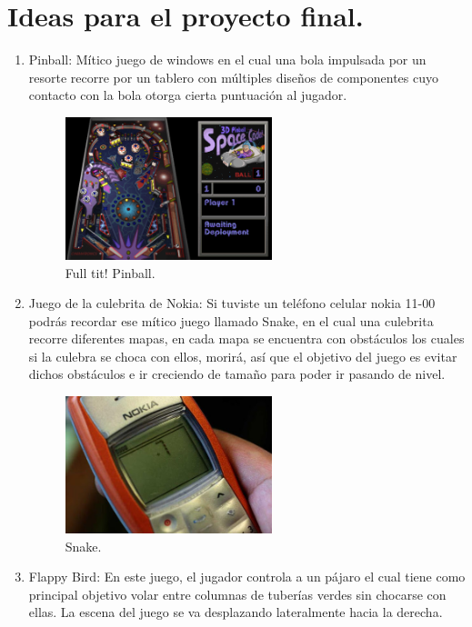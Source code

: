 \documentclass{article}
\begin{document}
\section{Ideas para el proyecto final.} \label{contenido}
\begin{enumerate}
  \item {Pinball:} Mítico juego de windows en el cual una bola impulsada por un resorte recorre por un tablero con múltiples diseños de componentes cuyo contacto con la bola otorga cierta puntuación al jugador.
  \begin{figure}[h]
  \includegraphics[width=6cm]{pinball.png}
  \centering
  \caption{Full tit! Pinball.\cite{pinball}}
  \label{fig:pinball}
  \end{figure}
  \item {Juego de  la culebrita de Nokia:} Si tuviste un teléfono celular nokia 11-00 podrás recordar ese mítico juego llamado Snake, en el cual una culebrita recorre diferentes mapas, en cada mapa se encuentra con obstáculos los cuales si la culebra se choca con ellos, morirá, así que el objetivo del juego es evitar dichos obstáculos e ir creciendo de tamaño para poder ir pasando de nivel.
  \begin{figure}[h]
  \includegraphics[width=6cm]{snake.jpg}
  \centering
  \caption{Snake.\cite{snake}}
  \label{fig:snake}
  \end{figure}
  \item {Flappy Bird: }En este juego, el jugador controla a un pájaro el cual tiene como principal objetivo volar entre columnas de tuberías verdes sin chocarse con ellas. La escena del juego se va desplazando lateralmente hacia la derecha.
  \begin{figure}[h]

\end{figure}
\end{enumerate}
\end{document}
